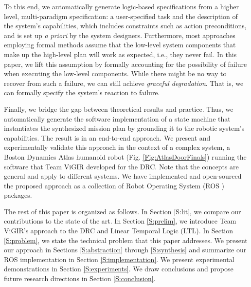 To this end, we automatically generate logic-based specifications from a higher level, multi-paradigm specification: a user-specified task and the description of the system's capabilities, which includes constraints such as action preconditions, and is set up \emph{a priori} by the system designers.
Furthermore, most approaches employing formal methods assume that the low-level system components that make up the high-level plan will work as expected, i.e., they never fail.
In this paper, we lift this assumption by formally accounting for the possibility of failure when executing the low-level components.
While there might be no way to recover from such a failure, we can still achieve \emph{graceful degradation}.
That is, we can formally specify the system's reaction to failure.

Finally, we bridge the gap between theoretical results and practice. 
Thus, we automatically generate the software implementation of a state machine that instantiates the synthesized mission plan by grounding it to the robotic system's capabilities.
The result is in an end-to-end approach.
We present and experimentally validate this approach in the context of a complex system, a Boston Dynamics Atlas humanoid robot (Fig. \ref{Fig:AtlasDoorFinals}) running the software that Team ViGIR developed for the DRC.
Note that the concepts are general and apply to different systems.
We have implemented and open-sourced the proposed approach as a collection of Robot Operating System (ROS \cite{ROS}) packages.

The rest of this paper is organized as follows.
In Section \ref{S:lit}, we compare our contributions to the state of the art.
In Section \ref{S:prelim}, we introduce Team ViGIR's approach to the DRC and Linear Temporal Logic (LTL).
In Section \ref{S:problem}, we state the technical problem that this paper addresses.
We present our approach in Sections \ref{S:abstraction} through \ref{S:synthesis} and summarize our ROS implementation in Section \ref{S:implementation}.
We present experimental demonstrations in Section \ref{S:experiments}.
We draw conclusions and propose future research directions in Section \ref{S:conclusion}.

